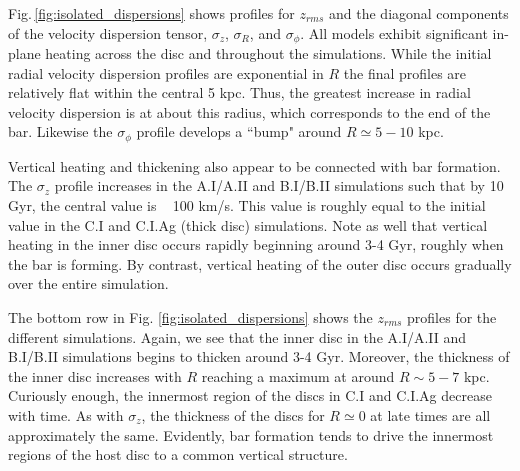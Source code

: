 Fig.\,\ref{fig:isolated_dispersions} shows profiles for $z_{rms}$ and the
diagonal components of the velocity dispersion tensor, $\sigma_z$,
$\sigma_R$, and $\sigma_\phi$.
{All models exhibit
significant in-plane heating across the disc and throughout the
simulations. While the initial radial velocity dispersion profiles are
exponential in $R$ the final profiles are relatively flat within the central 5
kpc. Thus, the greatest increase in radial velocity dispersion is at
about this radius, which corresponds to the end of the bar. Likewise
the $\sigma_\phi$ profile develops a ``bump" around
$R\simeq 5-10$ kpc.}


{Vertical heating and thickening also appear to be connected with
bar formation.  The $\sigma_z$ profile increases in the A.I/A.II and B.I/B.II simulations such
that by 10 Gyr, the central value is ~ 100 km/s. This value is roughly
equal to the initial value in the C.I and C.I.Ag (thick disc)
simulations. Note as well that vertical heating in the inner disc
occurs rapidly beginning around 3-4 Gyr, roughly when the bar
is forming. By contrast, vertical heating of the outer disc occurs
gradually over the entire simulation.}


{The bottom row in Fig. \ref{fig:isolated_dispersions} shows the $z_{rms}$ profiles for the different
simulations. Again, we see that the inner disc in the A.I/A.II and B.I/B.II
simulations begins to thicken around 3-4 Gyr. Moreover, the thickness of the inner disc
increases with $R$ reaching a maximum at around $R \sim 5-7$ kpc.
Curiously enough, the innermost region of the discs in C.I and C.I.Ag
decrease with time. As with $\sigma_z$, the thickness of the discs for
$R\simeq 0$ at late times are all approximately the same.
Evidently, bar formation tends to drive the innermost regions of the host disc
to a common vertical structure. }

